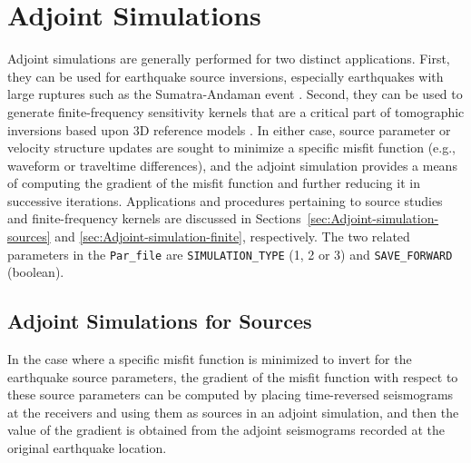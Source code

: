 \documentclass[oneside,english]{book}
\begin{document}
\chapter{\label{cha:Adjoint-Simulations}Adjoint Simulations}

Adjoint simulations are generally performed for two distinct applications.
First, they can be used for earthquake source inversions, especially
earthquakes with large ruptures such as the Sumatra-Andaman event
\citep{LayKanamoriAmmon2005,AmmonJiThio2005,ParkSongTromp2005}. Second,
they can be used to generate finite-frequency sensitivity kernels
that are a critical part of tomographic inversions based upon 3D reference
models \citep{TrTaLi05,LiTr06,TrKoLi08,LiTr08}. In either case, source
parameter or velocity structure updates are sought to minimize a specific
misfit function (e.g., waveform or traveltime differences), and the
adjoint simulation provides a means of computing the gradient of the
misfit function and further reducing it in successive iterations.
Applications and procedures pertaining to source studies and finite-frequency
kernels are discussed in Sections~\ref{sec:Adjoint-simulation-sources}
and \ref{sec:Adjoint-simulation-finite}, respectively. The two related
parameters in the \texttt{Par\_file} are \texttt{SIMULATION\_TYPE}
(1, 2 or 3) and \texttt{SAVE\_FORWARD} (boolean).


\section{\label{sec:Adjoint-simulation-sources}Adjoint Simulations for Sources}

In the case where a specific misfit function is minimized to invert
for the earthquake source parameters, the gradient of the misfit function
with respect to these source parameters can be computed by placing
time-reversed seismograms at the receivers and using them as sources
in an adjoint simulation, and then the value of the gradient is obtained
from the adjoint seismograms recorded at the original earthquake location.
\end{document}
